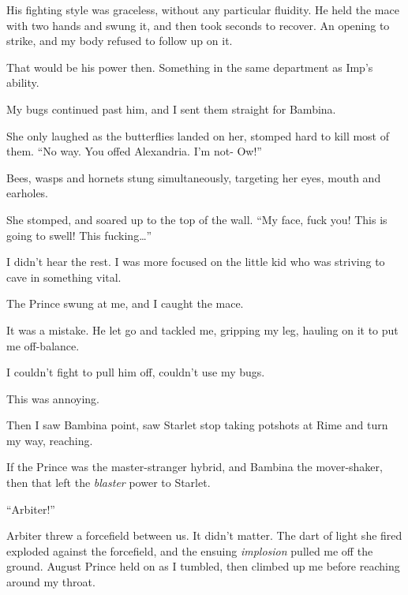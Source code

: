 His fighting style was graceless, without any particular fluidity.  He held the mace with two hands and swung it, and then took seconds to recover.  An opening to strike, and my body refused to follow up on it.



That would be his power then.  Something in the same department as Imp's ability.



My bugs continued past him, and I sent them straight for Bambina.



She only laughed as the butterflies landed on her, stomped hard to kill most of them.  ``No way.  You offed Alexandria.  I'm not-  Ow!''



Bees, wasps and hornets stung simultaneously, targeting her eyes, mouth and earholes.



She stomped, and soared up to the top of the wall.  ``My face, fuck you!  This is going to swell!  This fucking\ldots''



I didn't hear the rest.  I was more focused on the little kid who was striving to cave in something vital.



The Prince swung at me, and I caught the mace.



It was a mistake.  He let go and tackled me, gripping my leg, hauling on it to put me off-balance.



I couldn't fight to pull him off, couldn't use my bugs.



This was annoying.



Then I saw Bambina point, saw Starlet stop taking potshots at Rime and turn my way, reaching.



If the Prince was the master-stranger hybrid, and Bambina the mover-shaker, then that left the \emph{blaster} power to Starlet.



``Arbiter!''



Arbiter threw a forcefield between us.  It didn't matter.  The dart of light she fired exploded against the forcefield, and the ensuing \emph{implosion} pulled me off the ground.  August Prince held on as I tumbled, then climbed up me before reaching around my throat.



